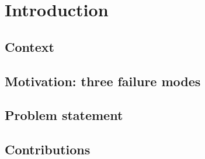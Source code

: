 \chapter{Introduction}
\label{ch:introduction}


\section{Context}
\label{sec:intro_context}

\section{Motivation: three failure modes}
\label{sec:intro_motivation}

\section{Problem statement}
\label{sec:intro_problem}

\section{Contributions}
\label{sec:intro_contributions}


